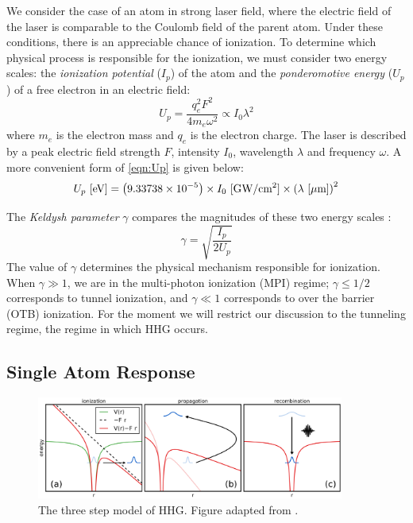 We consider the case of an atom in strong laser field, where the electric field of the laser is comparable to the Coulomb field of the parent atom. Under these conditions, there is an appreciable chance of ionization. To determine which physical process is responsible for the ionization, we must consider two energy scales: the \textit{ionization potential} ($I_p$) of the atom and the \textit{ponderomotive energy} ($U_p$) of a free electron in an electric field:
\begin{equation}
U_p = \frac{q_e^2 F^2}{4 m_e \omega^2} \propto I_0 \lambda^2
\label{eqn:Up}
\end{equation}
where $m_e$ is the electron mass and $q_e$ is the electron charge. The laser is described by a peak electric field strength $F$, intensity $I_0$, wavelength $\lambda$ and frequency $\omega$. A more convenient form of \cref{eqn:Up} is given below:
\begin{equation}
U_p \textrm{ [eV]} = \left( 9.33738 \times 10^{-5} \right) \times I_0 \ \textrm{[GW/cm\textsuperscript{2}]} \times \left(\lambda \ [\mu \textrm{m}] \right)^2
\label{eqn:Up-numbers}
\end{equation}

The \textit{Keldysh parameter} $\gamma$ compares the magnitudes of these two energy scales \cite{keldyshIonizationFieldStrong1965}:
\begin{equation}
\gamma = \sqrt{\frac{I_p}{2 U_p}}
\end{equation}
The value of $\gamma$ determines the physical mechanism responsible for ionization. When ${\gamma \gg 1}$, we are in the multi-photon ionization (MPI) regime; ${\gamma \le 1/2}$ corresponds to tunnel ionization, and ${\gamma \ll 1}$ corresponds to over the barrier (OTB) ionization. For the moment we will restrict our discussion to the tunneling regime, the regime in which HHG occurs.

\subsection{Single Atom Response}
\label{sec:single-atom-response}

\begin{figure}
	\centering
	\includegraphics[width=0.9\textwidth]{figures/chap1/ThreeStepModel.png}
	\caption{The three step model of HHG. Figure adapted from \cite{schounAttosecondHighHarmonicSpectroscopy2015}.}
	\label{fig:ThreeStepModel}
\end{figure}

